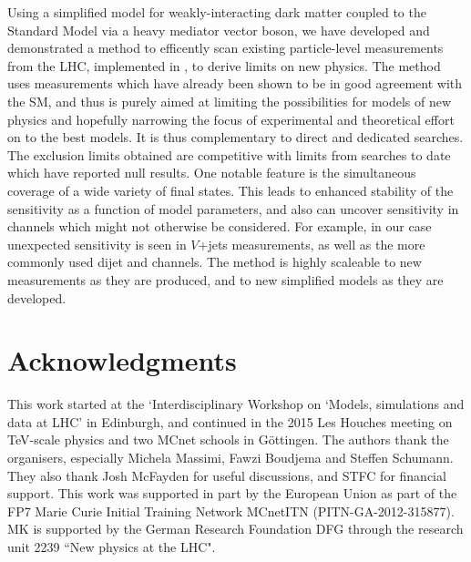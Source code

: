 \documentclass[floatfix]{article}
\begin{document}
Using a simplified model for weakly-interacting dark matter coupled to the Standard Model via a heavy mediator vector boson, we have developed and demonstrated 
a method to efficently scan existing particle-level measurements from the LHC, implemented in \rivet, to derive limits on new physics. 
The \Contur method uses measurements which have already been shown to be in good agreement with the SM, and thus is purely aimed at limiting the possibilities 
for models of new physics and hopefully narrowing the focus of experimental and theoretical effort on to the best models. It is thus complementary to 
direct and dedicated searches. The exclusion limits obtained are competitive with limits from searches to  date which have reported null results.
One notable feature is the simultaneous coverage of a wide variety of final states. This leads to enhanced stability of the sensitivity as a function of model
parameters, and also can uncover sensitivity in channels which might not otherwise be considered. For example, in our case unexpected sensitivity is seen in
$V$+jets measurements, as well as the more commonly used dijet and \MET channels. The method is highly scaleable to new measurements as they are produced, and
to new simplified models as they are developed.




\section*{Acknowledgments}
This work started at the `Interdisciplinary Workshop on ‘Models, simulations and data at LHC' in Edinburgh, and continued in the 2015 Les Houches meeting on 
TeV-scale physics and two MCnet schools in G\"ottingen. The authors thank the organisers, especially Michela Massimi, Fawzi Boudjema and Steffen Schumann. 
They also thank Josh McFayden for useful discussions, and STFC for financial support. This work was supported in part by the European Union as part of the FP7 Marie Curie Initial Training Network MCnetITN (PITN-GA-2012-315877). MK is supported by the German Research Foundation DFG through the research unit 2239 ``New physics at the LHC". 

%


\end{document}
